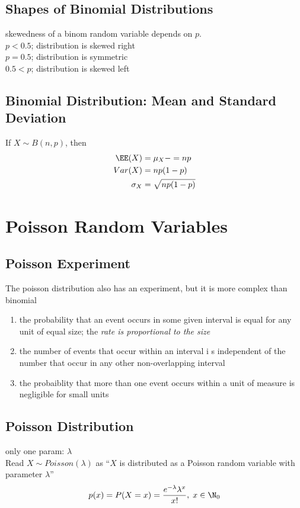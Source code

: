 \subsection{Shapes of Binomial Distributions}
skewedness of a binom random variable depends on $p$. \\
$p<0.5$; distribution is skewed right \\
$p=0.5$; distribution is symmetric  \\
$0.5<p$; distribution is skewed left


\subsection{Binomial Distribution: Mean and Standard Deviation}
If $X\sim B(n,p)$, then
\begin{align}
    \EE(X)&=\mu_X-=np\\
    Var(X)&=np(1-p)\\
    \sigma_X&=\sqrt{np(1-p)}
\end{align}

\section{Poisson Random Variables}  %


\subsection{Poisson Experiment}  %
The poisson distribution also has an experiment, but it is more complex than  binomial
\begin{enumerate}
    \item the probability that an event occurs in some given interval is equal for any unit of equal size; the \it{rate} is proportional to the size
    \item the number of events that occur within an interval i s independent of the number that occur in any other non-overlapping interval
    \item the probaiblity that more than one event occurs within a unit of measure is negligible for small units
\end{enumerate}

\subsection{Poisson Distribution}  %
only one param: $\lambda$ \\
Read $X\sim Poisson(\lambda)$ as ``$X$ is distributed as a Poisson random variable with parameter $\lambda$''
\begin{equation}
    p(x)=P(X=x)=\frac{e^{-\lambda}\lambda^x}{x!},\; x\in\N_0
\end{equation}


